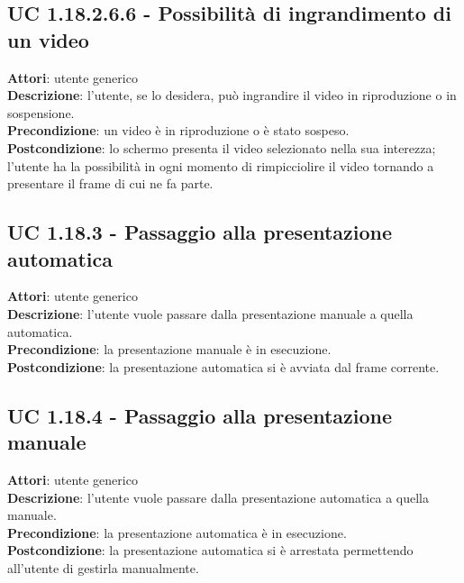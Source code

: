 	\subsection{UC 1.18.2.6.6 - Possibilità di ingrandimento di un video}{
		\label{uc1.18.2.6.6}
		\textbf{Attori}: utente generico \\
		\textbf{Descrizione}: l'utente, se lo desidera, può ingrandire il video in riproduzione o in sospensione. \\
		\textbf{Precondizione}: un video è in riproduzione o è stato sospeso.	\\
		\textbf{Postcondizione}: lo schermo presenta il video selezionato nella sua interezza; l'utente ha la possibilità in ogni momento di rimpicciolire il video tornando a presentare il frame di cui ne fa parte.	\\
	}
	\subsection{UC 1.18.3 - Passaggio alla presentazione automatica}{
		\label{uc1.18.3}
		\textbf{Attori}: utente generico \\
		\textbf{Descrizione}: l'utente vuole passare dalla presentazione manuale a quella automatica. \\
		\textbf{Precondizione}: la presentazione manuale è in esecuzione.	\\
		\textbf{Postcondizione}: la presentazione automatica si è avviata dal frame corrente.	\\
	}
	\subsection{UC 1.18.4 - Passaggio alla presentazione manuale}{
		\label{uc1.18.4}
		\textbf{Attori}: utente generico \\
		\textbf{Descrizione}: l'utente vuole passare dalla presentazione automatica a quella manuale. \\
		\textbf{Precondizione}: la presentazione automatica è in esecuzione.	\\
		\textbf{Postcondizione}: la presentazione automatica si è arrestata permettendo all'utente di gestirla manualmente.	\\
	}